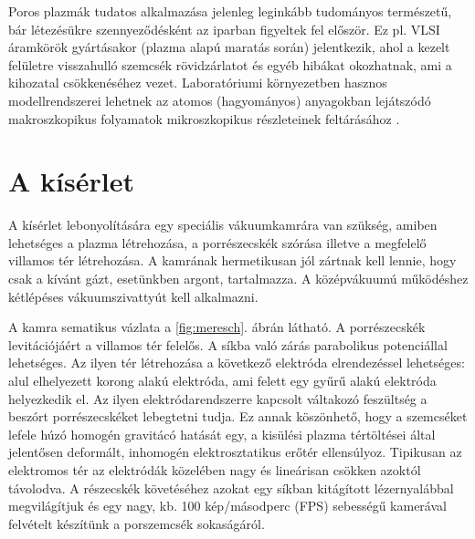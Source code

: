         Poros plazmák tudatos alkalmazása jelenleg leginkább
           tudományos természetű, bár létezésükre szennyeződésként
           az iparban figyeltek fel először. Ez pl. VLSI áramkörök gyártásakor
           (plazma alapú maratás során) jelentkezik, ahol a kezelt
           felületre visszahulló szemcsék rövidzárlatot és egyéb
           hibákat okozhatnak, ami a kihozatal csökkenéséhez
	vezet. Laboratóriumi környezetben hasznos modellrendszerei
        lehetnek az atomos (hagyományos) anyagokban lejátszódó
        makroszkopikus folyamatok mikroszkopikus részleteinek
        feltárásához \cite{Garmisch}. 

\section{A kísérlet}

	A kísérlet lebonyolítására egy speciális vákuumkamrára van szükség, amiben lehetséges a plazma
	létrehozása, a porrészecskék szórása illetve a megfelelő villamos tér létrehozása.
	A kamrának hermetikusan jól zártnak kell lennie, hogy csak a
        kívánt gázt, esetünkben argont, tartalmazza.
	A középvákuumú működéshez kétlépéses vákuumszivattyút kell alkalmazni.
		
	A kamra sematikus vázlata a \ref{fig:meresch}. ábrán látható.
	A porrészecskék levitációjáért a villamos tér felelős. A síkba való zárás parabolikus
	potenciállal lehetséges. Az ilyen tér létrehozása a következő elektróda elrendezéssel lehetséges:
	alul elhelyezett korong alakú elektróda, ami felett egy gyűrű alakú elektróda helyezkedik el.
	Az ilyen elektródarendszerre kapcsolt váltakozó feszültség a beszórt porrészecskéket lebegtetni
	tudja. Ez annak köszönhető, hogy a szemcséket lefele húzó
        homogén gravitácó hatását egy, a kisülési plazma tértöltései
        által jelentősen deformált, inhomogén elektrosztatikus erőtér
        ellensúlyoz. Tipikusan az elektromos tér az elektródák
        közelében nagy és lineárisan csökken azoktól távolodva. 
        A részecskék követéséhez azokat egy síkban kitágított
        lézernyalábbal megvilágítjuk és egy nagy, kb. 100 kép/másodperc (FPS) sebességű kamerával
	felvételt készítünk a porszemcsék sokaságáról.
	
